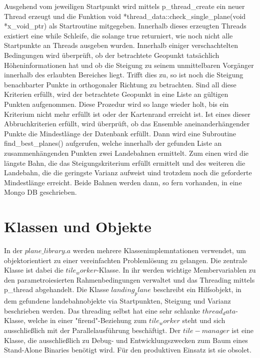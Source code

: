 \documentclass[10pt,a4paper]{report}
\begin{document}
Ausgehend vom jeweiligen Startpunkt wird mittels p\_thread\_create ein neuer Thread erzeugt und die Funktion void *thread\_data::check\_single\_plane(void *x\_void\_ptr) als Startroutine mitgegeben. Innerhalb dieses erzeugten Threads existiert eine while Schleife, die solange true returniert, wie noch nicht alle Startpunkte an Threads ausgeben wurden.
Innerhalb einiger verschachtelten Bedingungen wird überprüft, ob der betrachtete Geopunkt tatsächlich Höheninformationen hat und ob die Steigung zu seinem unmittelbaren Vorgänger innerhalb des erlaubten Bereiches liegt.
Trifft dies zu, so ist noch die Steigung benachbarter Punkte in orthogonaler Richtung zu betrachten. Sind all diese Kriterien erfüllt, wird der betrachtete Geopunkt in eine Liste an gültigen Punkten aufgenommen. Diese Prozedur wird so lange wieder holt, bis ein Kriterium nicht mehr erfüllt ist oder der Kartenrand erreicht ist.
Ist eines dieser Abbruchkriterien erfüllt, wird überprüft, ob das Ensemble aneinanderhängender Punkte die Mindestlänge der Datenbank erfüllt.
Dann wird eine Subroutine find\_best\_planes() aufgerufen, welche innerhalb der gefunden Liste an zusammenhängenden Punkten zwei Landebahnen ermittelt. Zum einen wird die längste Bahn, die das Steigungskriterium erfüllt ermittelt und des weiteren die Landebahn, die die geringste Varianz aufweist uind trotzdem noch die geforderte Mindestlänge erreicht. 
Beide Bahnen werden dann, so fern vorhanden, in eine Mongo DB geschrieben.

\section{Klassen und Objekte}

In der $plane\_library.a$ werden mehrere Klassenimplemntationen verwendet, um objektorientiert zu einer vereinfachten Problemlösung zu gelangen.
Die zentrale Klasse ist dabei die $tile_worker$-Klasse. In ihr werden wichtige Membervariablen zu den parametroiesierten Rahmenbedingungen verwaltet und das Threading mittels p_thread abgehandelt. Die Klasse $landing_plane$ beschreibt ein Hilfsobjekt, in dem gefundene landebahnobjekte via Startpunkten, Steigung und Varianz beschrieben werden.
Das threading selbst hat eine sehr schlanke $thread_data$-Klasse, welche in einer "firend"-Beziehung zum $tile_worker$ steht und sich ausschließlich mit der Parallelausführung beschäftigt.
Der $tile-manager$ ist eine Klasse, die ausschließlich zu Debug- und Entwicklungszwecken zum Baum eines Stand-Alone Binaries benötigt wird.
Für den produktiven Einsatz ist sie obsolet.
\end{document}
